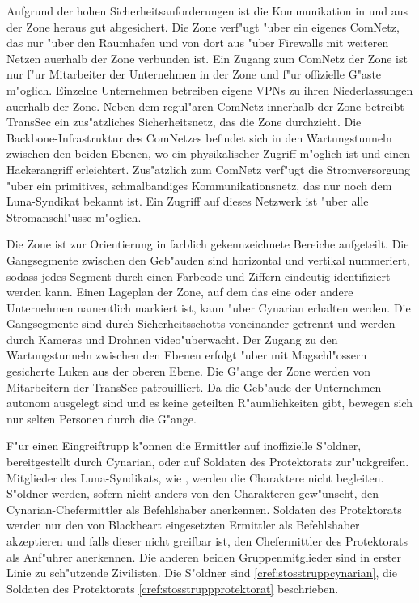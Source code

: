 Aufgrund der hohen Sicherheitsanforderungen ist die Kommunikation in und aus der Zone heraus gut abgesichert. Die Zone verf"ugt "uber ein eigenes ComNetz, das nur "uber den Raumhafen und von dort aus "uber Firewalls mit weiteren Netzen au\3erhalb der Zone verbunden ist. Ein Zugang zum ComNetz der Zone ist nur f"ur Mitarbeiter der Unternehmen in der Zone und f"ur offizielle G"aste m"oglich. Einzelne Unternehmen betreiben eigene VPNs zu ihren Niederlassungen au\3erhalb der Zone. Neben dem regul"aren ComNetz innerhalb der Zone betreibt TransSec ein zus"atzliches Sicherheitsnetz, das die Zone durchzieht. Die Backbone-Infrastruktur des ComNetzes befindet sich in den Wartungstunneln zwischen den beiden Ebenen, wo ein physikalischer Zugriff m"oglich ist und einen Hackerangriff erleichtert. Zus"atzlich zum ComNetz verf"ugt die Stromversorgung "uber ein primitives, schmalbandiges Kommunikationsnetz, das nur noch dem Luna-Syndikat bekannt ist. Ein Zugriff auf dieses Netzwerk ist "uber alle Stromanschl"usse m"oglich.

Die Zone ist zur Orientierung in farblich gekennzeichnete Bereiche aufgeteilt. Die Gangsegmente zwischen den Geb"auden sind horizontal und vertikal nummeriert, sodass jedes Segment durch einen Farbcode und Ziffern eindeutig identifiziert werden kann. Einen Lageplan der Zone, auf dem das eine oder andere Unternehmen namentlich markiert ist, kann "uber Cynarian erhalten werden. Die Gangsegmente sind durch Sicherheitsschotts voneinander getrennt und werden durch Kameras und Drohnen video"uberwacht. Der Zugang zu den Wartungstunneln zwischen den Ebenen erfolgt "uber mit Magschl"ossern gesicherte Luken aus der oberen Ebene. Die G"ange der Zone werden von Mitarbeitern der TransSec patrouilliert. Da die Geb"aude der Unternehmen autonom ausgelegt sind und es keine geteilten R"aumlichkeiten gibt, bewegen sich nur selten Personen durch die G"ange.

F"ur einen Eingreiftrupp k"onnen die Ermittler auf inoffizielle S"oldner, bereitgestellt durch Cynarian, oder auf Soldaten des Protektorats zur"uckgreifen. Mitglieder des Luna-Syndikats, wie \xl{}, werden die Charaktere nicht begleiten. S"oldner werden, sofern nicht anders von den Charakteren gew"unscht, den Cynarian-Chefermittler als Befehlshaber anerkennen. Soldaten des Protektorats werden nur den von Blackheart eingesetzten Ermittler als Befehlshaber akzeptieren und falls dieser nicht greifbar ist, den Chefermittler des Protektorats als Anf"uhrer anerkennen. Die anderen beiden Gruppenmitglieder sind in erster Linie zu sch"utzende Zivilisten. Die S"oldner sind  \cref{cref:stosstruppcynarian}, die Soldaten des Protektorats \cref{cref:stosstruppprotektorat} beschrieben.

